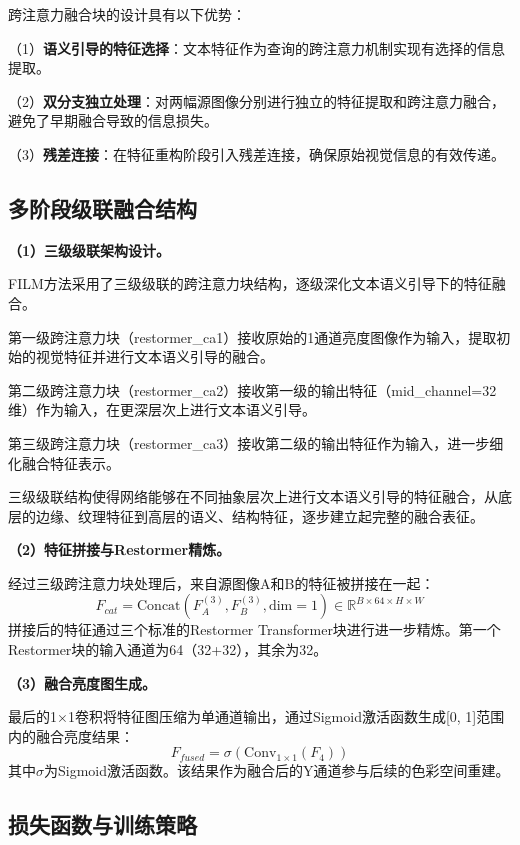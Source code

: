 跨注意力融合块的设计具有以下优势：

（1）\textbf{语义引导的特征选择}：文本特征作为查询的跨注意力机制实现有选择的信息提取。

（2）\textbf{双分支独立处理}：对两幅源图像分别进行独立的特征提取和跨注意力融合，避免了早期融合导致的信息损失。

（3）\textbf{残差连接}：在特征重构阶段引入残差连接，确保原始视觉信息的有效传递。

\subsection{多阶段级联融合结构}\label{sec:cascade_fusion}

\textbf{（1）三级级联架构设计。}

FILM方法采用了三级级联的跨注意力块结构，逐级深化文本语义引导下的特征融合。

第一级跨注意力块（restormer\_ca1）接收原始的1通道亮度图像作为输入，提取初始的视觉特征并进行文本语义引导的融合。

第二级跨注意力块（restormer\_ca2）接收第一级的输出特征（mid\_channel=32维）作为输入，在更深层次上进行文本语义引导。

第三级跨注意力块（restormer\_ca3）接收第二级的输出特征作为输入，进一步细化融合特征表示。

三级级联结构使得网络能够在不同抽象层次上进行文本语义引导的特征融合，从底层的边缘、纹理特征到高层的语义、结构特征，逐步建立起完整的融合表征。

\textbf{（2）特征拼接与Restormer精炼。}

经过三级跨注意力块处理后，来自源图像A和B的特征被拼接在一起：
\begin{equation}
    F_{cat} = \text{Concat}(F_A^{(3)}, F_B^{(3)}, \text{dim}=1) \in \mathbb{R}^{B \times 64 \times H \times W}
\end{equation}
拼接后的特征通过三个标准的Restormer Transformer块进行进一步精炼。第一个Restormer块的输入通道为64（32+32），其余为32。

\textbf{（3）融合亮度图生成。}

最后的1$\times$1卷积将特征图压缩为单通道输出，通过Sigmoid激活函数生成[0, 1]范围内的融合亮度结果：
\begin{equation}
    F_{fused} = \sigma(\text{Conv}_{1\times1}(F_4))
\end{equation}
其中$\sigma$为Sigmoid激活函数。该结果作为融合后的Y通道参与后续的色彩空间重建。

\subsection{损失函数与训练策略}\label{sec:loss_training}

